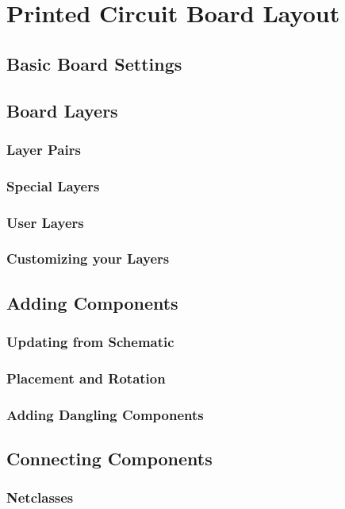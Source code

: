 
\chapter{Printed Circuit Board Layout}
\label{ch:pcbnew}

\section{Basic Board Settings}

\section{Board Layers}
\subsection{Layer Pairs}
\subsection{Special Layers}
\subsection{User Layers}
\subsection{Customizing your Layers}

\section{Adding Components}
\subsection{Updating from Schematic}
\subsection{Placement and Rotation}
\subsection{Adding Dangling Components}

\section{Connecting Components}
\subsection{Netclasses}

